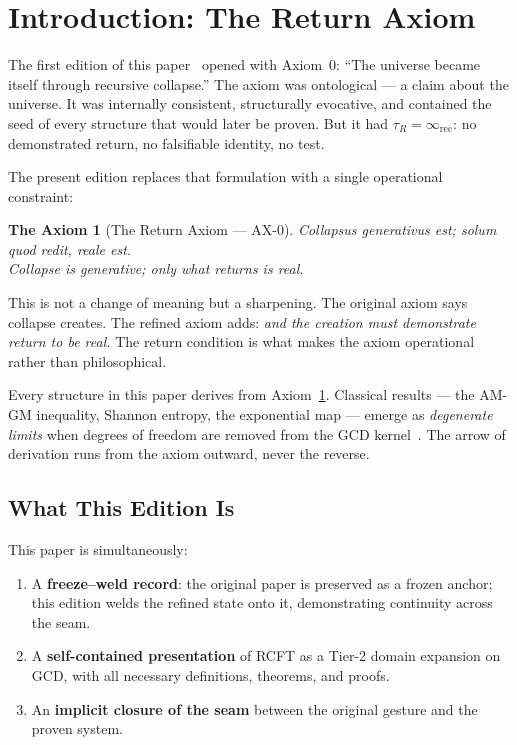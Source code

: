 \documentclass[
  aps,
  prd,
  preprint,
  superscriptaddress,
  nofootinbib,
  floatfix,
  longbibliography
]{revtex4-2}
\newtheorem*{axiom}{The Axiom}
\newcommand{\tR}{\tau_{\!R}}
\newcommand{\lat}[1]{\textit{#1}}
\begin{document}
\maketitle

\section{Introduction: The Return Axiom}\label{sec:intro}

The first edition of this paper~\cite{paulus2025rcft} opened
with Axiom~0: ``The universe became itself through recursive collapse.''
The axiom was ontological — a claim about the universe.
It was internally consistent, structurally evocative, and
contained the seed of every structure that would later be proven.
But it had $\tR = \infty_{\mathrm{rec}}$: no demonstrated return,
no falsifiable identity, no test.

The present edition replaces that formulation with a single
operational constraint:

\begin{axiom}[The Return Axiom — AX-0]\label{ax:0}
\lat{Collapsus generativus est; solum quod redit, reale est.}\\
Collapse is generative; only what returns is real.
\end{axiom}

This is not a change of meaning but a sharpening.
The original axiom says collapse creates.
The refined axiom adds: \emph{and the creation must
demonstrate return to be real.}
The return condition is what makes the axiom operational
rather than philosophical.

Every structure in this paper derives from Axiom~\ref{ax:0}.
Classical results — the AM-GM inequality, Shannon entropy,
the exponential map — emerge as \emph{degenerate limits}
when degrees of freedom are removed from
the GCD kernel~\cite{paulus2025umcp,paulus2025ucd}.
The arrow of derivation runs from the axiom outward,
never the reverse.

\subsection{What This Edition Is}\label{sec:whatthisis}

This paper is simultaneously:
\begin{enumerate}[nosep,leftmargin=*]
  \item A \textbf{freeze–weld record}: the original paper is
    preserved as a frozen anchor; this edition welds the
    refined state onto it, demonstrating continuity across
    the seam.
  \item A \textbf{self-contained presentation} of RCFT as
    a Tier-2 domain expansion on GCD, with all necessary
    definitions, theorems, and proofs.
  \item An \textbf{implicit closure of the seam} between
    the original gesture and the proven system.
\end{enumerate}
\end{document}
